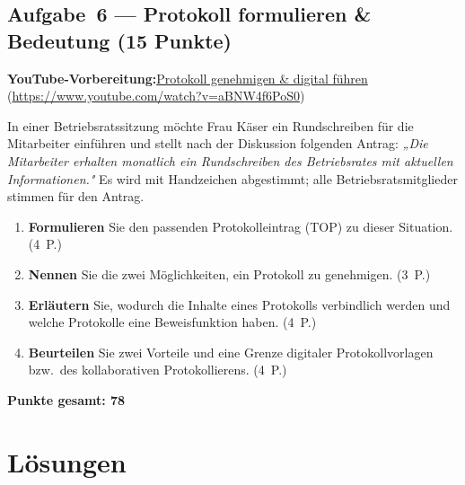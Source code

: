 \documentclass[11pt, a4paper]{article}
\begin{document}
\subsection*{Aufgabe~6 --- Protokoll formulieren \& Bedeutung (15 Punkte)}

\noindent\textbf{\color{bfwAccent}YouTube-Vorbereitung:}\enspace \href{https://www.youtube.com/watch?v=aBNW4f6PoS0}{Protokoll genehmigen \& digital führen} (\url{https://www.youtube.com/watch?v=aBNW4f6PoS0})

\medskip
In einer Betriebsratssitzung möchte Frau Käser ein Rundschreiben für die Mitarbeiter
einführen und stellt nach der Diskussion folgenden Antrag: \emph{„Die Mitarbeiter erhalten
monatlich ein Rundschreiben des Betriebsrates mit aktuellen Informationen."} Es wird mit
Handzeichen abgestimmt; alle Betriebsratsmitglieder stimmen für den Antrag.

\begin{enumerate}[label=(\alph*)]
  \item \textbf{Formulieren} Sie den passenden Protokolleintrag (TOP) zu dieser Situation. \hfill (4~P.)
  \item \textbf{Nennen} Sie die zwei Möglichkeiten, ein Protokoll zu genehmigen. \hfill (3~P.)
  \item \textbf{Erläutern} Sie, wodurch die Inhalte eines Protokolls verbindlich werden und welche Protokolle eine Beweisfunktion haben. \hfill (4~P.)
  \item \textbf{Beurteilen} Sie zwei Vorteile und eine Grenze digitaler Protokollvorlagen bzw.\ des kollaborativen Protokollierens. \hfill (4~P.)
\end{enumerate}

\vspace{1em}
\noindent\textbf{Punkte gesamt: 78}

\newpage

\section{Lösungen}\label{loesungen}
\end{document}
